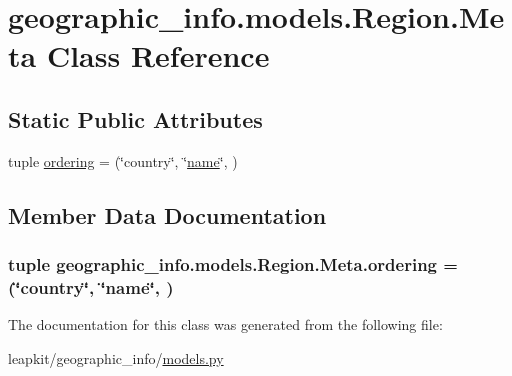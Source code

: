 \hypertarget{classgeographic__info_1_1models_1_1_region_1_1_meta}{\section{geographic\-\_\-info.\-models.\-Region.\-Meta Class Reference}
\label{classgeographic__info_1_1models_1_1_region_1_1_meta}
}
\subsection*{Static Public Attributes}
\begin{DoxyCompactItemize}
\item 
tuple \hyperlink{classgeographic__info_1_1models_1_1_region_1_1_meta_ad71c64a62213389ee97a57dbce2bbea9}{ordering} = (\char`\"{}country\char`\"{}, \char`\"{}\hyperlink{classgeographic__info_1_1models_1_1_region_a5dc5da2f74af6b51c99842bdbeb7315d}{name}\char`\"{}, )
\end{DoxyCompactItemize}


\subsection{Member Data Documentation}
\hypertarget{classgeographic__info_1_1models_1_1_region_1_1_meta_ad71c64a62213389ee97a57dbce2bbea9}{
\subsubsection[{ordering}]{\setlength{\rightskip}{0pt plus 5cm}tuple geographic\-\_\-info.\-models.\-Region.\-Meta.\-ordering = (\char`\"{}country\char`\"{}, \char`\"{}{\bf name}\char`\"{}, )\hspace{0.3cm}{\ttfamily [static]}}}\label{classgeographic__info_1_1models_1_1_region_1_1_meta_ad71c64a62213389ee97a57dbce2bbea9}


The documentation for this class was generated from the following file\-:\begin{DoxyCompactItemize}
\item 
leapkit/geographic\-\_\-info/\hyperlink{geographic__info_2models_8py}{models.\-py}\end{DoxyCompactItemize}
